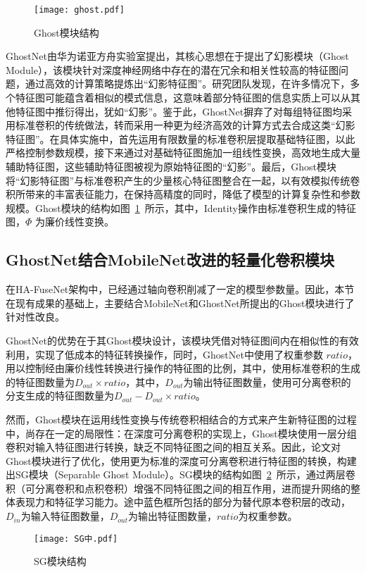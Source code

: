 \begin{figure}
    \centering
    \texttt{[image: ghost.pdf]}
    \caption{Ghost模块结构\cite{han2020ghostnet}}
    \label{fig:ghost}
\end{figure}
GhostNet\cite{han2020ghostnet}由华为诺亚方舟实验室提出，其核心思想在于提出了幻影模块（Ghost Module），该模块针对深度神经网络中存在的潜在冗余和相关性较高的特征图问题，通过高效的计算策略提炼出“幻影特征图”。研究团队发现，在许多情况下，多个特征图可能蕴含着相似的模式信息，这意味着部分特征图的信息实质上可以从其他特征图中推衍得出，犹如“幻影”。鉴于此，GhostNet摒弃了对每组特征图均采用标准卷积的传统做法，转而采用一种更为经济高效的计算方式去合成这类“幻影特征图”。在具体实施中，首先运用有限数量的标准卷积层提取基础特征图，以此严格控制参数规模，接下来通过对基础特征图施加一组线性变换，高效地生成大量辅助特征图，这些辅助特征图被视为原始特征图的“幻影”。最后，Ghost模块将“幻影特征图”与标准卷积产生的少量核心特征图整合在一起，以有效模拟传统卷积所带来的丰富表征能力，在保持高精度的同时，降低了模型的计算复杂性和参数规模。Ghost模块的结构如图~\ref{fig:ghost}~所示，其中，Identity操作由标准卷积生成的特征图，\(\Phi\) 为廉价线性变换。

\subsection{GhostNet结合MobileNet改进的轻量化卷积模块}

在HA-FuseNet架构中，已经通过轴向卷积削减了一定的模型参数量。因此，本节在现有成果的基础上，主要结合MobileNet和GhostNet所提出的Ghost模块进行了针对性改良。

GhostNet的优势在于其Ghost模块设计，该模块凭借对特征图间内在相似性的有效利用，实现了低成本的特征转换操作，同时，GhostNet中使用了权重参数 \(ratio\)，用以控制经由廉价线性转换进行操作的特征图的比例，其中，使用标准卷积的生成的特征图数量为\(D_{out} \times ratio\)，其中，\(D_{out}\)为输出特征图数量，使用可分离卷积的分支生成的特征图数量为\(D_{out}-D_{out} \times ratio\)。

然而，Ghost模块在运用线性变换与传统卷积相结合的方式来产生新特征图的过程中，尚存在一定的局限性：在深度可分离卷积的实现上，Ghost模块使用一层分组卷积对输入特征图进行转换，缺乏不同特征图之间的相互关系。因此，论文对Ghost模块进行了优化，使用更为标准的深度可分离卷积进行特征图的转换，构建出SG模块（Separable Ghost Module）。SG模块的结构如图~\ref{fig:sg}~所示，通过两层卷积（可分离卷积和点积卷积）增强不同特征图之间的相互作用，进而提升网络的整体表现力和特征学习能力。途中蓝色框所包括的部分为替代原本卷积层的改动，\(D_{in}\)为输入特征图数量，\(D_{out}\)为输出特征图数量，\(ratio\)为权重参数。
\begin{figure}
    \centering
    \texttt{[image: SG中.pdf]}
    \caption{SG模块结构}
    \label{fig:sg}
\end{figure}

